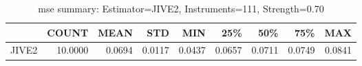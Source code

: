 \begin{table}[ht]
\centering
\caption{mse summary: Estimator=JIVE2, Instruments=111, Strength=0.70}
\begin{tabular}{lrrrrrrrr}
\toprule
 & COUNT & MEAN & STD & MIN & 25\% & 50\% & 75\% & MAX \\
\midrule
JIVE2 & 10.0000 & 0.0694 & 0.0117 & 0.0437 & 0.0657 & 0.0711 & 0.0749 & 0.0841 \\
\bottomrule
\end{tabular}
\end{table}
